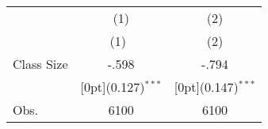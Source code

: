 \begin{tabular*}{\textwidth}{@{\extracolsep{\fill}}lcc}		
	& \multicolumn{1}{c}{(1)} &	\multicolumn{1}{c}{(2)} \\
\cline{2-3}		
	& \multicolumn{1}{c}{(1)\mbox{\ }} &	\multicolumn{1}{c}{(2)} \\
\hline		
Class Size &	-.598 &	-.794 \\
&	\raisebox{.7ex}[0pt]{\scriptsize (0.127)$^{***}$} &	\raisebox{.7ex}[0pt]{\scriptsize (0.147)$^{***}$} \\
Obs. &	6100 &	6100 \\
\hline\hline		
\end{tabular*}%

